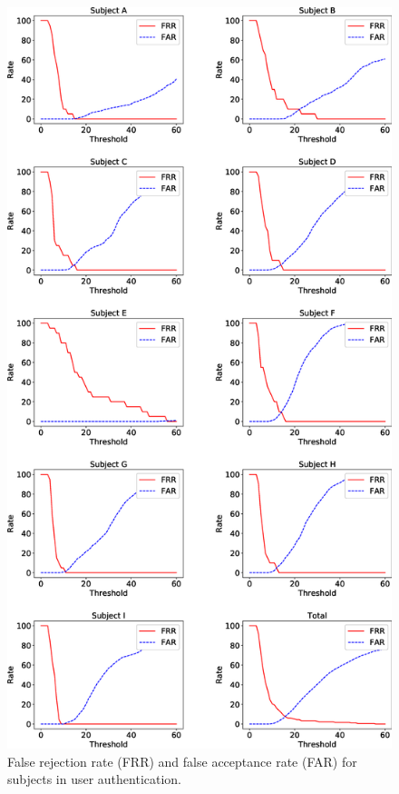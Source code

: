 \documentclass[english,preprint,JIP]{ipsj}
\begin{document}
\begin{figure}[!t]
  \centering
    \includegraphics[width=1\linewidth]{figure/EER.eps}
  \caption{False rejection rate (FRR) and false acceptance rate (FAR) for subjects in user authentication.}
  \label{fig:EER}
\end{figure}
\end{document}
